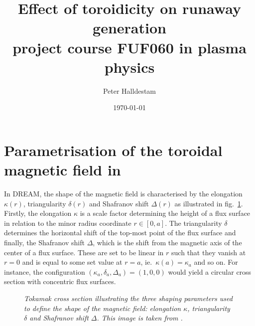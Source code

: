 \documentclass[11pt,a4paper]{article}
\title{Effect of toroidicity on runaway generation\\\vspace{.3cm} \large{project course FUF060 in plasma physics}}
\author{Peter Halldestam}
\date{\today}
\begin{document}
\maketitle

\section{Parametrisation of the toroidal magnetic field in}
In \textsc{DREAM}, the shape of the magnetic field is characterised by the elongation $\kappa(r)$, triangularity $\delta(r)$ and Shafranov shift $\Delta(r)$ as illustrated in fig.\ \ref{fig:toroidicity}.
Firstly, the elongation $\kappa$ is a scale factor determining the height of a flux surface in relation to the minor radius coordinate $r\in[0, a]$.
The triangularity $\delta$ determines the horizontal shift of the top-most point of the flux surface and finally, the Shafranov shift $\Delta$, which is the shift from the magnetic axis of the center of a flux surface.
These are set to be linear in $r$ such that they vanish at $r=0$ and is equal to some set value at $r=a$, ie.\ $\kappa(a)=\kappa_a$ and so on.
For instance, the configuration $(\kappa_a, \delta_a, \Delta_a)=(1, 0, 0)$ would yield a circular cross section with concentric flux surfaces.

\begin{figure}[H]
  \begin{minipage}[l]{0.6\textwidth}
    
  \end{minipage}
  \hfill
  \begin{minipage}[c]{0.4\textwidth}
      \caption{\textit{Tokamak cross section illustrating the three shaping parameters used to define the shape of the magnetic field: elongation $\kappa$, triangularity $\delta$ and Shafranov shift $\Delta$.
      This image is taken from \cite{DREAM}.}}
      \label{fig:toroidicity}
  \end{minipage}
\end{figure}
\end{document}
